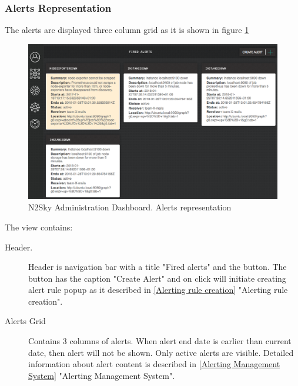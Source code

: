 \subsubsection{Alerts Representation}\label{Alerts representation}

The alerts are displayed three column grid as it is shown in figure \ref{fig:alert_representation}

\begin{figure}[H]
\begin{center}
  \includegraphics[width=\linewidth]{components/4/pics/alert_representation.png}
  \caption{N2Sky Administration Dashboard. Alerts representation}
  \label{fig:alert_representation}
\end{center}
\end{figure}

The view contains:

\begin{description}
\item[Header.] Header is navigation bar with a title "Fired alerts" and the button. The button has the caption "Create Alert" and on click will initiate creating alert rule popup as it described in \autoref{Alerting rule creation} "Alerting rule creation".
\item[Alerts Grid] Contains 3 columns of alerts. When alert end date is earlier than current date, then alert will not be shown. Only active alerts are visible. Detailed information about alert content is described in \autoref{Alerting Management System} "Alerting Management System".
\end{description}


